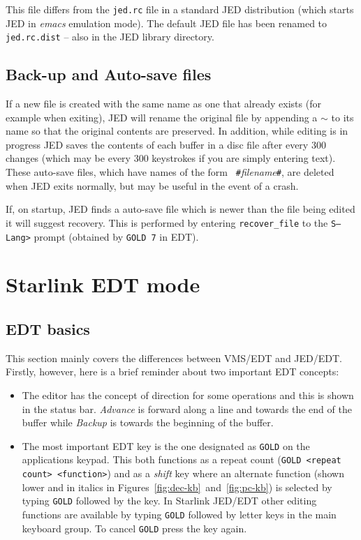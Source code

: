 \documentclass[twoside,11pt]{article}
\newcommand{\xlabel}[1]{}
\begin{document}
This file differs from the \texttt{jed.rc} file in a standard JED
distribution (which starts JED in \textit{emacs} emulation mode). The
default JED file has been renamed to \texttt{jed.rc.dist}  -- also in
the JED library directory.

\subsection{\xlabel{backup_and_auto-save_files}Back-up and Auto-save files}
\label{backup_and_auto-save_files}

If a new file is created with the same name as one that already exists
(for example when exiting), JED will rename the original file by
appending a $\sim$ to its name so that the original contents are
preserved. In addition, while editing is in progress JED saves the
contents of each buffer in a disc file after every 300 changes (which may
be every 300 keystrokes if you are simply entering text). These auto-save
files, which have names of the form {\tt
\#}{\em filename}\texttt{\#}, are deleted when JED exits
normally, but may be useful in the event of a crash.

If, on startup, JED finds a auto-save file which is newer than the file being
edited it will suggest recovery. This is performed by entering
\texttt{recover\_file} to the \texttt{S--Lang>} prompt (obtained by
\texttt{GOLD 7} in EDT).

\section{\xlabel{starlink_edt_mode}Starlink EDT mode}
\label{starlink_edt_mode}

\subsection{\xlabel{edt_basics}EDT basics}
\label{edt_basics}

This section mainly covers the  differences between VMS/EDT and
JED/EDT\@. Firstly, however, here is a brief reminder about two important EDT
concepts:
\begin{itemize}
\item The editor has the concept of direction for some operations and
this is shown in the status bar. \textit{Advance} is forward along a
line and towards the end of the buffer while \textit{Backup} is towards the
beginning of the buffer.

\item The most important EDT key is the one designated as \texttt{GOLD} on
the applications keypad. This both functions as a repeat count
(\texttt{GOLD <repeat count> <function>}) and as a
\textit{shift} key where an alternate function (shown lower and in italics in
Figures~{\ref{fig:dec-kb}}~and~\ref{fig:pc-kb}) is selected by typing
\texttt{GOLD} followed by the key. In Starlink JED/EDT other editing
functions are available by typing \texttt{GOLD} followed by letter keys in
the main keyboard group. To cancel \texttt{GOLD} press the key again.

\end{itemize}
\end{document}
